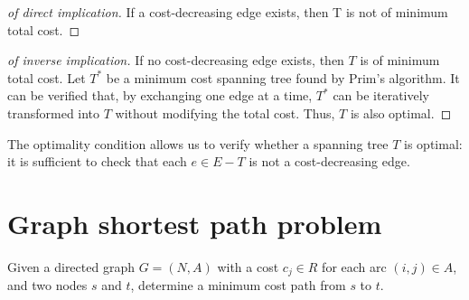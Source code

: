 \documentclass[12pt, a4paper]{report}
\newtheorem[style=M,bodystyle=\normalfont]{theorem}{Theorem}
\newtheorem[style=M,bodystyle=\normalfont]{corollary}{Corollary}
\newtheorem[style=M,bodystyle=\normalfont]{lemma}{Lemma}
\newtheorem[style=M,bodystyle=\normalfont]{definition}{Definition}
\begin{document}
    \begin{proof}[of direct implication]
        If a cost-decreasing edge exists, then T is not of minimum total cost.
    \end{proof}
    \begin{proof}[of inverse implication]
        If no cost-decreasing edge exists, then $T$ is of minimum total cost. Let $T^{*}$ be a minimum cost spanning tree found by Prim's algorithm. It can be verified that, by 
        exchanging one edge at a time, $T^{*}$ can be iteratively transformed into $T$ without modifying the total cost. Thus, $T$ is also optimal. 
    \end{proof}
    The optimality condition allows us to verify whether a spanning tree $T$ is optimal: it is sufficient to check that each $e \in E-T$ is not a cost-decreasing edge. 

    \section{Graph shortest path problem}
    Given a directed graph $G=(N,A)$ with a cost $c_j \in R$ for each arc $(i,j) \in A$, and two nodes $s$ and $t$, determine a minimum cost path from $s$ to $t$. 
\end{document}
